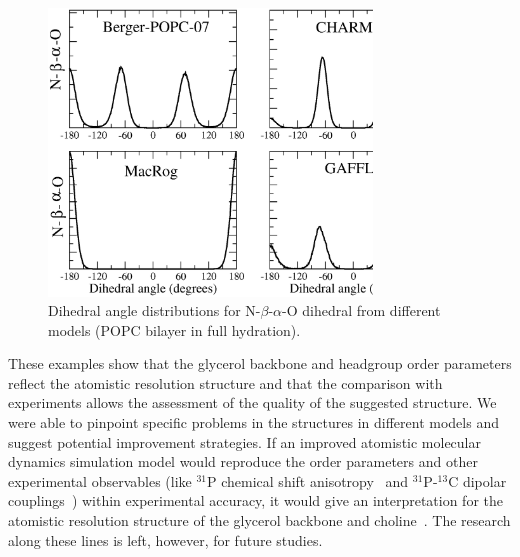 \documentclass[journal=jpcbfk,manuscript=article]{achemso}
\begin{document}
\begin{figure}[]
  \centering
  \includegraphics[width=8.6cm]{../Fig/a-bDIHS2.eps}
  \caption{\label{dihDISTS2}
    Dihedral angle distributions for N-$\beta$-$\alpha$-O dihedral from different models (POPC bilayer in full hydration).
  } 
\end{figure}

These examples show that the glycerol backbone and headgroup order parameters reflect the atomistic resolution structure
and that the comparison with experiments allows the assessment of the quality of the suggested structure. We were able to pinpoint
specific problems in the structures in different models and suggest potential improvement strategies.
If an improved atomistic
molecular dynamics simulation model would reproduce the order parameters and other experimental observables 
(like $^{31}$P chemical shift anisotropy~\cite{chowdhary13} and $^{31}$P-$^{13}$C dipolar couplings~\cite{prakash10})
within experimental accuracy, it would give an interpretation for the atomistic resolution structure of the glycerol backbone and 
choline~\cite{seelig77b,skarjune79,jacobs80,davis83,akutsu91,hong95b,semchyschyn04}. The research along these lines is left, however,
for future studies.
\end{document}
